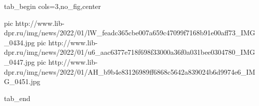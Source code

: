  
 
 
 
 


\ifcmt
  tab_begin cols=3,no_fig,center

     pic http://www.lib-dpr.ru/img/news/2022/01/lW_feadc365cbe007a659c47099f7168b91e00aff73_IMG_0434.jpg
		 pic http://www.lib-dpr.ru/img/news/2022/01/u6_aac6377e718f698f33000a36f0a031bee0304780_IMG_0447.jpg
		 pic http://www.lib-dpr.ru/img/news/2022/01/AH_b9b4e83126989ff6868c5642a839024b6d9974e6_IMG_0451.jpg

  tab_end
\fi
